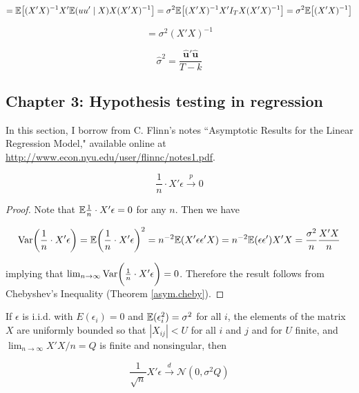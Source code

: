 \[
=\E \big[ (X'X)^{-1}X' \E(uu' \mid X)X(X'X)^{-1} \big] = \sigma^2 \E \big[ (X'X)^{-1}X' I_T X(X'X)^{-1} \big] = \sigma^2 \E \big[ (X'X)^{-1} \big]
\]

\[
= \sigma^2  (X'X)^{-1} 
\]

\[
\hat{\sigma}^2 = \frac{ \hat{\boldsymbol{u}}'  \hat{\boldsymbol{u}}}{T - k}
\]

\subsection{Chapter 3: Hypothesis testing in regression}

In this section, I borrow from C. Flinn's notes ``Asymptotic Results for the Linear Regression Model," available online at \url{http://www.econ.nyu.edu/user/flinnc/notes1.pdf}.


\begin{lemma} 

\[
\frac{1}{n} \cdot X' \epsilon \xrightarrow{p} 0
\]
\end{lemma}
\begin{proof}Note that \(\E \frac{1}{n} \cdot X' \epsilon = 0\) for any \(n\). Then we have

\[
\Var \bigg( \frac{1}{n} \cdot X' \epsilon \bigg) = \E\bigg( \frac{1}{n} \cdot X' \epsilon \bigg) ^2 = n^{-2} \E(X' \epsilon \epsilon' X)  = n^{-2} \E(\epsilon \epsilon' )X'X = \frac{\sigma^2}{n}  \frac{X'X}{n}
\]

implying that \(\lim_{n \to \infty} \Var \bigg( \frac{1}{n} \cdot X' \epsilon \bigg)=0\). Therefore the result follows from Chebyshev's Inequality (Theorem \ref{asym.cheby}). 
\end{proof}

\begin{lemma}\label{linreg.lemma.2.1} If \(\epsilon\) is i.i.d. with \(E(\epsilon_i) = 0\) and \(\E(\epsilon_i^2) = \sigma^2\) for all \(i\), the elements of the matrix \(X\) are uniformly bounded so that \(|X_{ij}| < U \) for all \(i\) and \(j\) and for \(U\) finite, and \(\lim_{n \to \infty} X'X/n = Q\) is finite and nonsingular, then

\[
\frac{1}{\sqrt{n}} X' \epsilon \xrightarrow{d} \mathcal{N}(0, \sigma^2 Q)
\]
\end{lemma}

